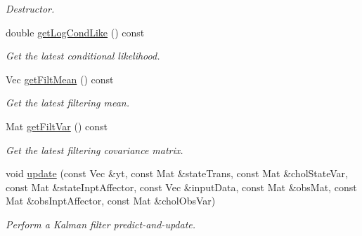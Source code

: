 \begin{DoxyCompactItemize}
\begin{DoxyCompactList}\small\item\em Destructor. \end{DoxyCompactList}\item 
double \hyperlink{classLgssm_abf04a9c7501ab5fa91246963b57721c4}{get\+Log\+Cond\+Like} () const 
\begin{DoxyCompactList}\small\item\em Get the latest conditional likelihood. \end{DoxyCompactList}\item 
Vec \hyperlink{classLgssm_aed914f9b681c5788dc11a49f2e31b74f}{get\+Filt\+Mean} () const 
\begin{DoxyCompactList}\small\item\em Get the latest filtering mean. \end{DoxyCompactList}\item 
Mat \hyperlink{classLgssm_a03c6188372603269f0497a66f41d0563}{get\+Filt\+Var} () const 
\begin{DoxyCompactList}\small\item\em Get the latest filtering covariance matrix. \end{DoxyCompactList}\item 
void \hyperlink{classLgssm_a1f21af488dde504b4c01ccd53ef60e2f}{update} (const Vec \&yt, const Mat \&state\+Trans, const Mat \&chol\+State\+Var, const Mat \&state\+Inpt\+Affector, const Vec \&input\+Data, const Mat \&obs\+Mat, const Mat \&obs\+Inpt\+Affector, const Mat \&chol\+Obs\+Var)
\begin{DoxyCompactList}\small\item\em Perform a Kalman filter predict-\/and-\/update. \end{DoxyCompactList}\end{DoxyCompactItemize}
